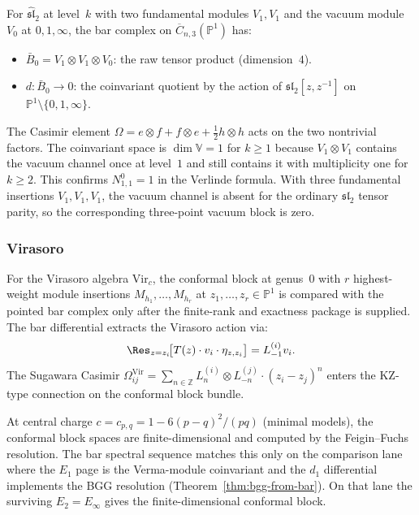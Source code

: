 \begin{example}
\label{ex:three-point-bar}
For $\widehat{\mathfrak{sl}}_2$ at level~$k$ with two
fundamental modules $V_1, V_1$ and the vacuum module $V_0$
at $0, 1, \infty$, the
bar complex on $\overline{C}_{n,3}(\mathbb{P}^1)$ has:
\begin{itemize}
\item $\bar{B}_0 = V_1 \otimes V_1 \otimes V_0$: the raw tensor
 product (dimension~$4$).
\item $d\colon \bar{B}_0 \to 0$: the coinvariant quotient by the
 action of $\mathfrak{sl}_2[z, z^{-1}]$ on
 $\mathbb{P}^1 \setminus \{0,1,\infty\}$.
\end{itemize}
The Casimir element
$\Omega = e \otimes f + f \otimes e + \tfrac{1}{2}h \otimes h$
acts on the two nontrivial factors. The coinvariant space is
$\dim \mathbb{V} = 1$ for $k \ge 1$ because
$V_1 \otimes V_1$ contains the vacuum channel once at level~$1$
and still contains it with multiplicity one for $k \ge 2$. This
confirms $N_{1,1}^0 = 1$ in the Verlinde formula. With three
fundamental insertions $V_1,V_1,V_1$, the vacuum channel is absent
for the ordinary $\mathfrak{sl}_2$ tensor parity, so the corresponding
three-point vacuum block is zero.
\end{example}

\subsubsection{Virasoro}

For the Virasoro algebra $\mathrm{Vir}_c$, the conformal block at
genus~$0$ with $r$ highest-weight module insertions
$M_{h_1}, \ldots, M_{h_r}$ at $z_1, \ldots, z_r \in \mathbb{P}^1$
is compared with the pointed bar complex only after the finite-rank
and exactness package is supplied. The bar differential extracts the
Virasoro action via:
\[
\Res_{z = z_i}\!\bigl[T(z) \cdot v_i \cdot \eta_{z,z_i}\bigr]
= L_{-1}^{(i)} v_i.
\]
The Sugawara Casimir
$\Omega^{\mathrm{Vir}}_{ij}
= \sum_{n \in \mathbb{Z}} L_n^{(i)} \otimes L_{-n}^{(j)}
\cdot (z_i - z_j)^{n}$
enters the KZ-type connection on the conformal block bundle.

At central charge $c = c_{p,q} = 1 - 6(p-q)^2/(pq)$ (minimal
models), the conformal block spaces are finite-dimensional and
computed by the Feigin--Fuchs resolution. The bar spectral sequence
matches this only on the comparison lane where the $E_1$ page is the
Verma-module coinvariant and the $d_1$ differential implements the BGG
resolution (Theorem~\ref{thm:bgg-from-bar}). On that lane the surviving
$E_2 = E_\infty$ gives the finite-dimensional conformal block.

